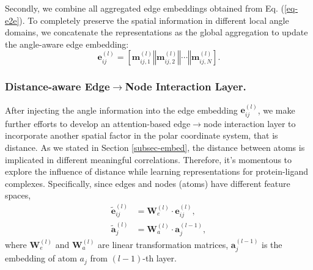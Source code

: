 \documentclass[sigconf]{acmart}
\newcommand{\cat}{\ensuremath{\mathbin\Vert}}
\begin{document}
Secondly, we combine all aggregated edge embeddings obtained from Eq. (\ref{eq-e2e}). To completely preserve the spatial information in different local angle domains, we concatenate the representations as the global aggregation to update the angle-aware edge embedding:
\begin{equation}
\label{eq-e-combine}
    \bm{e}^{(l)}_{ij} = [\bm{m}^{(l)}_{ij,1} \cat \bm{m}^{(l)}_{ij,2} \cat \cdots \cat \bm{m}^{(l)}_{ij,N}].
\end{equation}


\subsubsection{Distance-aware Edge$\rightarrow$Node Interaction Layer.}
After injecting the angle information into the edge embedding $\bm{e}^{(l)}_{ij}$, we make further efforts to develop an attention-based edge$\rightarrow$node interaction layer to incorporate another spatial factor in the polar coordinate system, that is distance. As we stated in Section \ref{subsec-embed}, the distance between atoms is implicated in different meaningful correlations. Therefore, it's momentous to explore the influence of distance while learning representations for protein-ligand complexes. Specifically, since edges and nodes (atoms) have different feature spaces, 
\begin{align}
\label{eq-node-trans}
    \tilde{\bm{e}}^{(l)}_{ij} &= \bm{W}^{(l)}_e \cdot \bm{e}^{(l)}_{ij},
    \\
    \tilde{\bm{a}}^{(l)}_{j} &= \bm{W}^{(l)}_a \cdot \bm{a}^{(l-1)}_{j},
\end{align}
where $\bm{W}^{(l)}_e$ and $\bm{W}^{(l)}_a$ are linear transformation matrices, $\bm{a}^{(l-1)}_{j}$ is the embedding of atom $a_j$ from $(l-1)$-th layer. 
\end{document}
